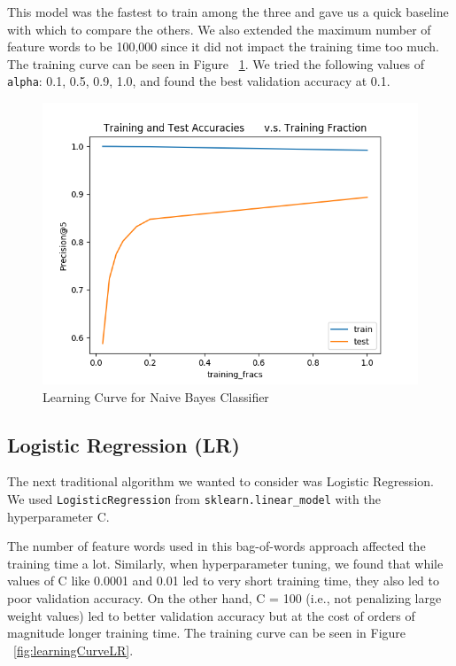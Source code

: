 \documentclass{sig-alternate-05-2015}
\begin{document}
This model was the fastest to train among the three and gave us a quick baseline with which to compare the others. We also extended the maximum number of feature words to be 100,000 since it did not impact the training time too much. The training curve can be seen in Figure ~\ref{fig:learningCurveNBC}. We tried the following values of \verb+alpha+: 0.1, 0.5, 0.9, 1.0, and found the best validation accuracy at 0.1.

\begin{figure}[H]
\centering
\includegraphics[width=\linewidth]{plots/learning_curve_nbc.png}
\caption{Learning Curve for Naive Bayes Classifier}
\label{fig:learningCurveNBC}
\end{figure}

\subsection{Logistic Regression (LR)}

The next traditional algorithm we wanted to consider was Logistic Regression. We used \verb+LogisticRegression+ from \verb+sklearn.linear_model+ with the hyperparameter C.

The number of feature words used in this bag-of-words \cite{logistic-regression:bag-of-words} approach affected the training time a lot. Similarly, when hyperparameter tuning, we found that while values of C like 0.0001 and 0.01 led to very short training time, they also led to poor validation accuracy. On the other hand, C = 100 (i.e., not penalizing large weight values) led to better validation accuracy but at the cost of orders of magnitude longer training time. The training curve can be seen in Figure ~\ref{fig:learningCurveLR}.
\end{document}
